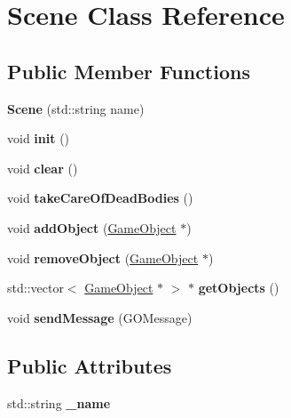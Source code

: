\hypertarget{class_scene}{}\section{Scene Class Reference}
\label{class_scene}
\subsection*{Public Member Functions}
\begin{DoxyCompactItemize}
\item 
\hypertarget{class_scene_a6fb788d6ae25d5293d3a58966cf29757}{}\label{class_scene_a6fb788d6ae25d5293d3a58966cf29757} 
{\bfseries Scene} (std\+::string name)
\item 
\hypertarget{class_scene_abb3b6efc6fdba03cd96436edaf08a967}{}\label{class_scene_abb3b6efc6fdba03cd96436edaf08a967} 
void {\bfseries init} ()
\item 
\hypertarget{class_scene_a70e5b1218abb729d70d9f41b107017f9}{}\label{class_scene_a70e5b1218abb729d70d9f41b107017f9} 
void {\bfseries clear} ()
\item 
\hypertarget{class_scene_a95d3218f52081eea9e34d2d2bdff94df}{}\label{class_scene_a95d3218f52081eea9e34d2d2bdff94df} 
void {\bfseries take\+Care\+Of\+Dead\+Bodies} ()
\item 
\hypertarget{class_scene_aed7c3cfbef1cfa439af13e56dfd5a07c}{}\label{class_scene_aed7c3cfbef1cfa439af13e56dfd5a07c} 
void {\bfseries add\+Object} (\hyperlink{class_game_object}{Game\+Object} $\ast$)
\item 
\hypertarget{class_scene_a9058ae3eed897e4e18f977abfd53e348}{}\label{class_scene_a9058ae3eed897e4e18f977abfd53e348} 
void {\bfseries remove\+Object} (\hyperlink{class_game_object}{Game\+Object} $\ast$)
\item 
\hypertarget{class_scene_a489e003d142172ed43136a35e49023bc}{}\label{class_scene_a489e003d142172ed43136a35e49023bc} 
std\+::vector$<$ \hyperlink{class_game_object}{Game\+Object} $\ast$ $>$ $\ast$ {\bfseries get\+Objects} ()
\item 
\hypertarget{class_scene_a8e5f774bacf4ebf59c19947f5c2a8585}{}\label{class_scene_a8e5f774bacf4ebf59c19947f5c2a8585} 
void {\bfseries send\+Message} (G\+O\+Message)
\end{DoxyCompactItemize}
\subsection*{Public Attributes}
\begin{DoxyCompactItemize}
\item 
\hypertarget{class_scene_afbb5064e07cb2904ecd2cfb0096a00c9}{}\label{class_scene_afbb5064e07cb2904ecd2cfb0096a00c9} 
std\+::string {\bfseries \+\_\+name}
\end{DoxyCompactItemize}
